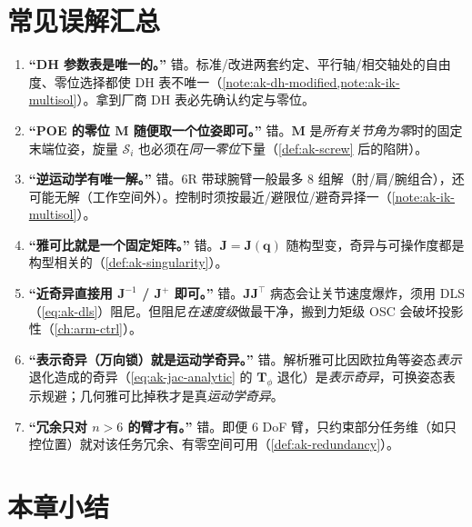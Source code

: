 \section*{常见误解汇总}

\begin{enumerate}
  \item \textbf{“DH 参数表是唯一的。”} 错。标准/改进两套约定、平行轴/相交轴处的自由度、零位选择都使 DH 表不唯一（\cref{note:ak-dh-modified,note:ak-ik-multisol}）。拿到厂商 DH 表必先确认约定与零位。
  \item \textbf{“POE 的零位 $\mathbf{M}$ 随便取一个位姿即可。”} 错。$\mathbf{M}$ 是\emph{所有关节角为零}时的固定末端位姿，旋量 $\mathcal{S}_i$ 也必须在\emph{同一零位}下量（\cref{def:ak-screw} 后的陷阱）。
  \item \textbf{“逆运动学有唯一解。”} 错。6R 带球腕臂一般最多 8 组解（肘/肩/腕组合），还可能无解（工作空间外）。控制时须按最近/避限位/避奇异择一（\cref{note:ak-ik-multisol}）。
  \item \textbf{“雅可比就是一个固定矩阵。”} 错。$\mathbf{J}=\mathbf{J}(\mathbf{q})$ 随构型变，奇异与可操作度都是构型相关的（\cref{def:ak-singularity}）。
  \item \textbf{“近奇异直接用 $\mathbf{J}^{-1}$ / $\mathbf{J}^{+}$ 即可。”} 错。$\mathbf{J}\mathbf{J}^\top$ 病态会让关节速度爆炸，须用 DLS（\cref{eq:ak-dls}）阻尼。但阻尼\emph{在速度级}做最干净，搬到力矩级 OSC 会破坏投影性（\cref{ch:arm-ctrl}）。
  \item \textbf{“表示奇异（万向锁）就是运动学奇异。”} 错。解析雅可比因欧拉角等姿态\emph{表示}退化造成的奇异（\cref{eq:ak-jac-analytic} 的 $\mathbf{T}_\phi$ 退化）是\emph{表示奇异}，可换姿态表示规避；几何雅可比掉秩才是真\emph{运动学奇异}。
  \item \textbf{“冗余只对 $n>6$ 的臂才有。”} 错。即便 6 DoF 臂，只约束部分任务维（如只控位置）就对该任务冗余、有零空间可用（\cref{def:ak-redundancy}）。
\end{enumerate}

\section*{本章小结}

